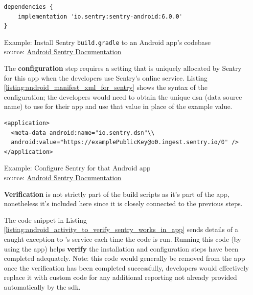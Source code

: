 \begin{listing}
\begin{verbatim}
dependencies {
    implementation 'io.sentry:sentry-android:6.0.0'
}
\end{verbatim}
\caption{Example: Install Sentry \texttt{build.gradle} to an Android app's codebase\\source: \href{https://docs.sentry.io/platforms/android/}{Android Sentry Documentation}}
\label{listing:build_gradle_for_sentry}
\end{listing}

The \textbf{configuration} step requires a setting that is uniquely allocated by Sentry for this app when the developers use Sentry's online service. Listing \ref{listing:android_manifest_xml_for_sentry} shows the syntax of the configuration; the developers would need to obtain the unique dsn (data source name) to use for their app and use that value in place of the example value.

\begin{listing}
\begin{verbatim}
<application>
  <meta-data android:name="io.sentry.dsn"\\
  android:value="https://examplePublicKey@o0.ingest.sentry.io/0" />
</application>
\end{verbatim}
\caption{Example: Configure Sentry for that Android app\\source: \href{https://docs.sentry.io/platforms/android/}{Android Sentry Documentation}}
\label{listing:android_manifest_xml_for_sentry}
\end{listing}

\textbf{Verification} is not strictly part of the build scripts as it's part of the app, nonetheless it's included here since it is closely connected to the previous steps.

The code snippet in Listing \ref{listing:android_activity_to_verify_sentry_works_in_app} sends details of a caught exception to 's service each time the code is run. Running this code (by using the app) helps \textbf{verify} the installation and configuration steps have been completed adequately. Note: this code would generally be removed from the app once the verification has been completed successfully, developers would effectively replace it with custom code for any additional reporting not already provided automatically by the \Gls{sdk}. %


